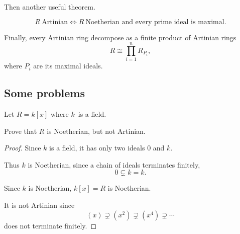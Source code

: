 \documentclass[11pt]{article}
\begin{document}
Then another useful theorem. 

\begin{thm}
    \[
        R \ \text{Artinian} \Leftrightarrow 
        R \ \text{Noetherian and every prime ideal is maximal}.
    \]
\end{thm}

Finally, every Artinian ring decompose as a finite 
product of Artinian rings 
\[
    R \cong \prod_{i=1}^n R_{P_i},  
\]
where $P_i$ are its maximal ideals. 

\subsection{Some problems}

\begin{prob}
    Let $R = k[x]$ where $k$ is a field. 

    Prove that $R$ is Noetherian, but not Artinian. 
\end{prob}
\begin{proof}
    Since $k$ is a field, it has only two ideals $0$ and $k$. 

    Thus $k$ is Noetherian, since a chain of ideals 
    terminates finitely, 
    \[
        0 \subsetneq k = k. 
    \]

    Since $k$ is Noetherian, $k[x] = R$ is Noetherian.  

    It is not Artinian since 
    \[
        (x) \supsetneq (x^2) \supsetneq (x^4) 
        \supsetneq \cdots 
    \]
    does not terminate finitely. 
\end{proof}
\end{document}
